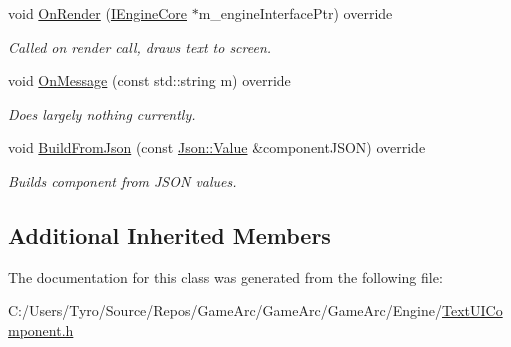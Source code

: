 \begin{DoxyCompactItemize}
\mbox{\label{class_text_u_i_component_aca5ef2d0ab17d8f8851c41391acc1d3b}} 
void \mbox{\hyperlink{class_text_u_i_component_aca5ef2d0ab17d8f8851c41391acc1d3b}{On\+Render}} (\mbox{\hyperlink{class_i_engine_core}{I\+Engine\+Core}} $\ast$m\+\_\+engine\+Interface\+Ptr) override
\begin{DoxyCompactList}\small\item\em Called on render call, draws text to screen. \end{DoxyCompactList}\item 
\mbox{\label{class_text_u_i_component_a830dc9a5050fdc98d11b23fa6effd815}} 
void \mbox{\hyperlink{class_text_u_i_component_a830dc9a5050fdc98d11b23fa6effd815}{On\+Message}} (const std\+::string m) override
\begin{DoxyCompactList}\small\item\em Does largely nothing currently. \end{DoxyCompactList}\item 
\mbox{\label{class_text_u_i_component_a780908f34b0ed8c49481af4c811a6279}} 
void \mbox{\hyperlink{class_text_u_i_component_a780908f34b0ed8c49481af4c811a6279}{Build\+From\+Json}} (const \mbox{\hyperlink{class_json_1_1_value}{Json\+::\+Value}} \&component\+J\+S\+ON) override
\begin{DoxyCompactList}\small\item\em Builds component from J\+S\+ON values. \end{DoxyCompactList}\end{DoxyCompactItemize}
\subsection*{Additional Inherited Members}


The documentation for this class was generated from the following file\+:\begin{DoxyCompactItemize}
\item 
C\+:/\+Users/\+Tyro/\+Source/\+Repos/\+Game\+Arc/\+Game\+Arc/\+Game\+Arc/\+Engine/\mbox{\hyperlink{_text_u_i_component_8h}{Text\+U\+I\+Component.\+h}}\end{DoxyCompactItemize}
